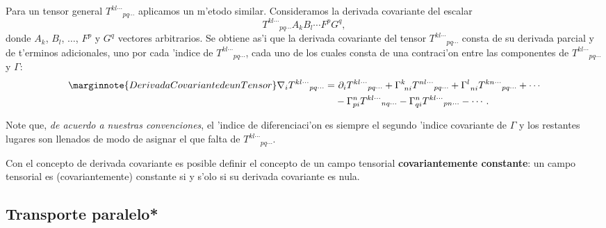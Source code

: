 Para un tensor general $T^{kl\cdots }{}_{pq\cdots }$ aplicamos un m'etodo similar. Consideramos la derivada covariante del escalar
\begin{equation}
T^{kl\cdots }{}_{pq\cdots }A_k B_l \cdots F^pG^q, \label{dinv16}
\end{equation}
donde $A_k $, $B_l $, $\dots $, $F^p$ y $G^q$ vectores arbitrarios. Se obtiene
as'i que la derivada covariante del tensor $T^{kl\cdots }{}_{pq\cdots}$ consta de su derivada parcial y de t'erminos adicionales, uno por
cada 'indice de $T^{kl\cdots }{}_{pq\cdots }$, cada uno de los cuales consta de
una contraci'on entre las componentes de $T^{kl\cdots }{}_{pq\cdots }$ y
$\Gamma$:
\begin{align}\marginnote{Derivada Covariante de un Tensor}
\nabla_iT^{kl\cdots }{}_{pq\cdots} =&\ \partial_iT^{kl\cdots
}{}_{pq\cdots}+\Gamma_{\ ni}^kT^{nl\cdots}{}_{pq\cdots } +\Gamma_{\
ni}^lT^{kn\cdots }{}_{pq\cdots} +\cdots \nonumber \\
&  -\Gamma_{pi}^nT^{kl\cdots}{}_{nq\cdots
}-\Gamma_{qi}^nT^{kl\cdots }{}_{pn\cdots }-\cdots . \label{dinv17}
\end{align}

Note que, \textit{de acuerdo a nuestras convenciones}, el 'indice de diferenciaci'on es siempre el segundo 'indice covariante de $\Gamma$ y los restantes lugares son llenados de modo de asignar el que falta de $T^{kl\cdots }{}_{pq\cdots }$.

Con el concepto de derivada covariante es posible definir el concepto de un
campo tensorial \textbf{covariantemente constante}: un campo tensorial es
(covariantemente) constante si y s'olo si su derivada covariante es nula.


\subsection{Transporte paralelo*}

